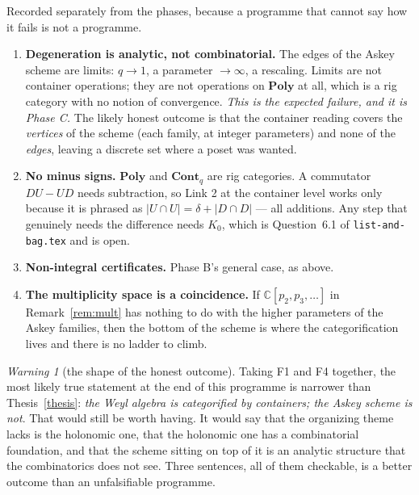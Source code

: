 \documentclass[11pt,a4paper]{article}
\theoremstyle{definition}
\theoremstyle{remark}
\newtheorem{warning}[theorem]{Warning}
\newcommand{\CC}{\mathbb{C}}
\newcommand{\cat}[1]{\mathbf{#1}}
\newcommand{\Cont}{\cat{Cont}}
\newcommand{\Poly}{\cat{Poly}}
\newcommand{\norm}[1]{\lvert #1 \rvert}
\begin{document}
Recorded separately from the phases, because a programme that cannot say how it fails
is not a programme.

\begin{enumerate}[label=\textbf{F\arabic*},leftmargin=2.6em]
  \item \textbf{Degeneration is analytic, not combinatorial.} The edges of the Askey
        scheme are limits: $q \to 1$, a parameter $\to \infty$, a rescaling. Limits are
        not container operations; they are not operations on $\Poly$ at all, which is a
        rig category with no notion of convergence. \emph{This is the expected failure,
        and it is Phase C.} The likely honest outcome is that the container reading
        covers the \emph{vertices} of the scheme (each family, at integer parameters)
        and none of the \emph{edges}, leaving a discrete set where a poset was wanted.
  \item \textbf{No minus signs.} $\Poly$ and $\Cont_q$ are rig categories. A commutator
        $DU - UD$ needs subtraction, so Link 2 at the container level works only because
        it is phrased as $\norm{U \cap U} = \delta + \norm{D \cap D}$ --- all additions.
        Any step that genuinely needs the difference needs
        $K_0$, which is Question~6.1 of \texttt{list-and-bag.tex} and is open.
  \item \textbf{Non-integral certificates.} Phase B's general case, as above.
  \item \textbf{The multiplicity space is a coincidence.} If $\CC[p_2,p_3,\dots]$ in
        Remark~\ref{rem:mult} has nothing to do with the higher parameters of the Askey
        families, then the bottom of the scheme is where the categorification lives and
        there is no ladder to climb.
\end{enumerate}

\begin{warning}[the shape of the honest outcome]\label{warn:honest}
Taking F1 and F4 together, the most likely true statement at the end of this programme
is narrower than Thesis~\ref{thesis}: \emph{the Weyl algebra is categorified by
containers; the Askey scheme is not}. That would still be worth having. It would say
that the organizing theme \cite{AAR} lacks is the holonomic one, that the holonomic
one has a combinatorial foundation, and that the scheme sitting on top of it is an
analytic structure that the combinatorics does not see. Three sentences, all of them
checkable, is a better outcome than an unfalsifiable programme.
\end{warning}
\end{document}
